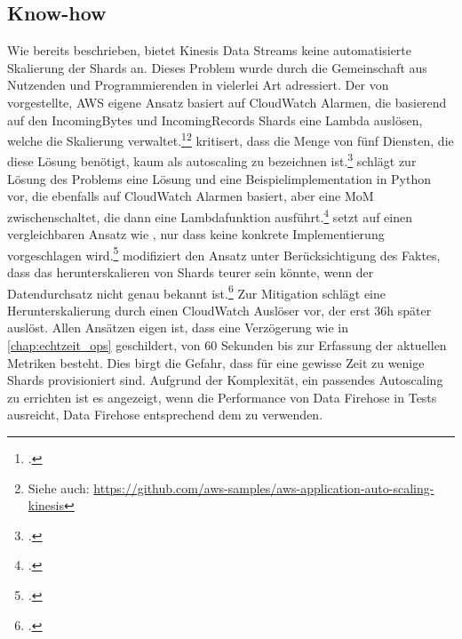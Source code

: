 \subsection{Know-how}
Wie bereits beschrieben, bietet Kinesis Data Streams keine automatisierte Skalierung der Shards an. Dieses Problem wurde durch die Gemeinschaft aus Nutzenden und Programmierenden in vielerlei Art adressiert. Der von \citeauthor{AmazonWebServices.2018} vorgestellte, \ac{AWS} eigene Ansatz basiert auf CloudWatch Alarmen, die basierend auf den IncomingBytes und IncomingRecords Shards eine Lambda auslösen, welche die Skalierung verwaltet.\footcite[Vgl.][]{AmazonWebServices.2018}\nzitat\footnote{Siehe auch: \url{https://github.com/aws-samples/aws-application-auto-scaling-kinesis}} \citeauthor{Pogosova.28.05.2020} kritisert, dass die Menge von fünf Diensten, die diese Lösung benötigt, kaum als autoscaling zu bezeichnen ist.\footcite[Vgl.][]{Pogosova.28.05.2020} \citeauthor{Stanley.2019} schlägt zur Lösung des Problems eine Lösung und eine Beispielimplementation in Python vor, die ebenfalls auf CloudWatch Alarmen basiert, aber eine \ac{MoM} zwischenschaltet, die dann eine Lambdafunktion ausführt.\footcite[Vgl.][]{Stanley.2019} \citeauthor{Prasath.2019} setzt auf einen vergleichbaren Ansatz wie \citeauthor{Stanley.2019}, nur dass keine konkrete Implementierung vorgeschlagen wird.\footcite[Vgl.][]{Prasath.2019} \citeauthor{Cui.2017} modifiziert den Ansatz unter Berücksichtigung des Faktes, dass das herunterskalieren von Shards teurer sein könnte, wenn der Datendurchsatz nicht genau bekannt ist.\footcite[Vgl. auch im Folgendn][]{Cui.2017} Zur Mitigation schlägt \citeauthor{Cui.2017} eine Herunterskalierung durch einen CloudWatch Auslöser vor, der erst 36h später auslöst. Allen Ansätzen eigen ist, dass eine Verzögerung wie in \autoref{chap:echtzeit_ops} geschildert, von 60 Sekunden bis zur Erfassung der aktuellen Metriken besteht. Dies birgt die Gefahr, dass für eine gewisse Zeit zu wenige Shards provisioniert sind. Aufgrund der Komplexität, ein passendes Autoscaling zu errichten ist es angezeigt, wenn die Performance von Data Firehose in Tests ausreicht, Data Firehose entsprechend dem  zu verwenden.


